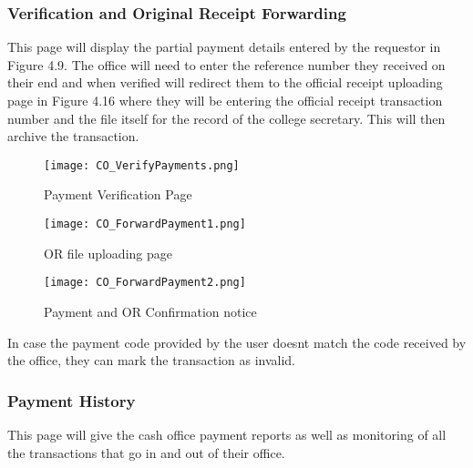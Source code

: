 \subsubsection{Verification and Original Receipt Forwarding}

This page will display the partial payment details entered by the requestor in Figure 4.9. The office will need to enter the reference number they received on their end and when verified will redirect them to the official receipt uploading page in Figure 4.16 where they will be entering the official receipt transaction number and the file itself for the record of the college secretary. This will then archive the transaction.

\begin{figure}[h]
    \centering 
    \begin{minipage}[c]{0.5\linewidth}
        \centering
        \texttt{[image: CO\_VerifyPayments.png]}
        \caption{Payment Verification Page}
        \label{fig:CO_VerifyPayments}
    \end{minipage}
\end{figure}

\begin{figure}[h]
    \centering 
    \begin{minipage}[c]{0.5\linewidth}
        \centering
        \texttt{[image: CO\_ForwardPayment1.png]}
        \caption{OR file uploading page}
        \label{fig:CO_ForwardPayment1}
    \end{minipage}\hfill
    \begin{minipage}[c]{0.5\linewidth}
        \centering
        \texttt{[image: CO\_ForwardPayment2.png]}
        \caption{Payment and OR Confirmation notice}
        \label{fig:CO_ForwardPayment2}
    \end{minipage}
\end{figure}

In case the payment code provided by the user doesn\textsc{}t match the code received by the office, they can mark the transaction as invalid.

\subsubsection{Payment History}

This page will give the cash office payment reports as well as monitoring of all the transactions that go in and out of their office.

